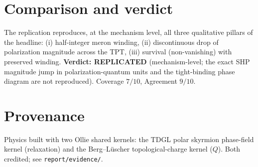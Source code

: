 \documentclass[11pt]{article}
\begin{document}
\section{Comparison and verdict}
The replication reproduces, at the mechanism level, all three qualitative pillars
of the headline: (i) half-integer meron winding, (ii) discontinuous drop of
polarization magnitude across the TPT, (iii) survival (non-vanishing) with
preserved winding. \textbf{Verdict: REPLICATED} (mechanism-level; the exact SHP
magnitude jump in polarization-quantum units and the tight-binding phase diagram
are not reproduced). Coverage $7/10$, Agreement $9/10$.

\section{Provenance}
Physics built with two Ollie shared kernels: the TDGL polar skyrmion phase-field
kernel (relaxation) and the Berg--Lüscher topological-charge kernel ($Q$). Both
credited; see \texttt{report/evidence/}.
\end{document}

